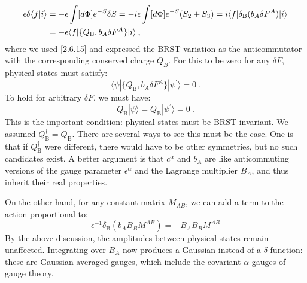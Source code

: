 \begin{align}
	\epsilon \delta\langle f \vert i\rangle &
	= - \epsilon\int [d\Phi] e^{-S} \delta S=-i\epsilon\int [d\Phi] e^{-S}(S_{2}+S_{3}) =i \langle f |\delta_{\mathrm{B}}(b_{A} \delta F^{A})| i \rangle \nonumber  \\
	&=-\epsilon\langle f |\{Q_{\mathrm{B}}, b_{A} \delta F^{A}\} | i \rangle \:, \label{4.2.8}
\end{align}
where we used \eqref{2.6.15} and  expressed the BRST variation as the anticommutator with the corresponding conserved charge $Q_B$. For this to be zero for any $\delta F$, physical states must satisfy:
\begin{equation}
	\langle\psi |\{Q_{\mathrm{B}}, b_{A} \delta F^{A} \}| \psi^{\prime}\rangle=0 \:. \label{4.2.9}
\end{equation}
To hold for arbitrary $\delta F$, we must have:
\begin{equation}
	Q_{\mathrm{B}}|\psi\rangle=Q_{\mathrm{B}}|\psi^{\prime}\rangle=0 \:. \label{4.2.10}
\end{equation}
This is the important condition: physical states must be BRST invariant. We assumed $Q_{\mathrm{B}}^{\dagger}=Q_{\mathrm{B}}$. There are several ways to see this must be the case. One is that if $Q_{\mathrm{B}}^{\dagger}$ were different, there would have to be other symmetries, but no such candidates exist. A better argument is that $c^{\alpha}$ and $b_{A}$ are like anticommuting versions of the gauge parameter $\epsilon^{\alpha}$ and the Lagrange multiplier $B_{A}$, and thus inherit their real properties.

On the other hand, for any constant matrix $M_{AB}$, we can add a term to the action proportional to:
\begin{equation}
	\epsilon^{-1} \delta_{\mathrm{B}}(b_{A} B_{B} M^{A B})=-B_{A} B_{B} M^{A B} \label{4.2.11}
\end{equation}
By the above discussion, the amplitudes between physical states remain unaffected. Integrating over $B_{A}$ now produces a Gaussian instead of a $\delta$-function: these are Gaussian averaged gauges, which include the covariant $\alpha$-gauges of gauge theory.

